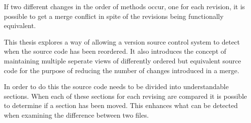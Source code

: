 If two different changes in the order of methods occur, one for each revision, it is possible to get a merge conflict in spite of the revisions being functionally equivalent.

This thesis explores a way of allowing a version source control system to detect when the source code has been reordered.  It also introduces the concept of maintaining multiple seperate views of differently ordered but equivalent source code for the purpose of reducing the number of changes introduced in a merge. 
 
In order to do this the source code needs to be divided into understandable sections. When each of these sections for each revising are compared it is possible to determine if a section has been moved.  This enhances what can be detected when examining the difference between two files.



